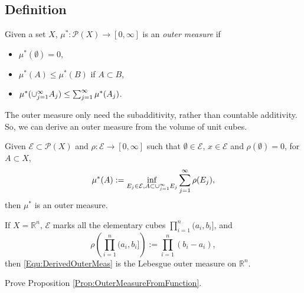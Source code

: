\subsection{Definition}
\begin{defn}
    Given a set $X$, $\mu^{*}:\mathcal{P}(X)\rightarrow[0,\infty]$ 
    is an \textit{outer measure} if 
    \begin{itemize}
        \item $\mu^{*}(\emptyset)=0$,
        \item $\mu^{*}(A)\le\mu^{*}(B)$ if $A\subset B$, 
        \item $\mu^{*}(\cup_{j=1}^{\infty}A_{j})\le\sum_{j=1}^{\infty}\mu^{*}(A_{j})$.
    \end{itemize}
\end{defn}
\begin{rem}
    The outer measure only need 
    the subadditivity, rather than countable additivity. 
    So, we can derive an outer measure from the volume of unit cubes.
\end{rem}
\begin{prop}
    \label{Prop:OuterMeasureFromFunction}
    Given $\mathcal{E}\subset\mathcal{P}(X)$ and 
    $\rho:\mathcal{E}\rightarrow[0,\infty]$ such that 
    $\emptyset\in\mathcal{E}$, $x\in\mathcal{E}$ 
    and $\rho(\emptyset)=0$, for $A\subset X$, 
    \begin{equation}
        \label{Equ:DerivedOuterMeas}
        \mu^{*}(A):=\inf_{E_j\in\mathcal{E},A\subset\cup_{j=1}^{\infty}E_j}
        \sum_{j=1}^{\infty}\rho(E_j),
    \end{equation}
    then $\mu^{*}$ is an outer measure.
\end{prop}
\begin{rem}
    If $X=\mathbb{R}^{n}$, $\mathcal{E}$ marks all the 
    elementary cubes $\prod_{i=1}^{n}(a_i,b_i]$, 
    and 
    \begin{displaymath}
        \rho\left(\prod_{i=1}^{n}(a_i,b_i]\right)
        :=\prod_{i=1}^{n}(b_i-a_i),
    \end{displaymath}
    then 
    \eqref{Equ:DerivedOuterMeas} is the Lebesgue outer measure 
    on $\mathbb{R}^{n}$.
\end{rem}
\begin{exc}
    Prove Proposition \ref{Prop:OuterMeasureFromFunction}.
\end{exc}
